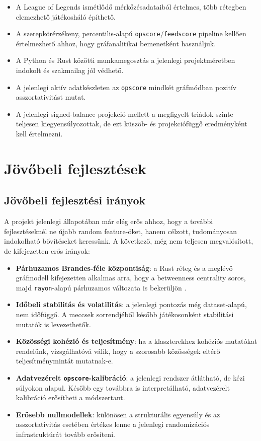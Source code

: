 \documentclass[a4paper,12pt]{report}
\begin{document}
\begin{itemize}
    \item A League of Legends ismétlődő mérkőzésadataiból értelmes, több rétegben elemezhető játékosháló építhető.
    \item A szerepkörérzékeny, percentilis-alapú \texttt{opscore}/\texttt{feedscore} pipeline kellően értelmezhető ahhoz, hogy gráfanalitikai bemenetként használjuk.
    \item A Python és Rust közötti munkamegosztás a jelenlegi projektméretben indokolt és szakmailag jól védhető.
    \item A jelenlegi aktív adatkészleten az \texttt{opscore} mindkét gráfmódban pozitív asszortativitást mutat.
    \item A jelenlegi signed-balance projekció mellett a megfigyelt triádok szinte teljesen kiegyensúlyozottak, de ezt küszöb- és projekciófüggő eredményként kell értelmezni.
\end{itemize}

\chapter{Jövőbeli fejlesztések}

\section{Jövőbeli fejlesztési irányok}

A projekt jelenlegi állapotában már elég erős ahhoz, hogy a további fejlesztéseknél ne újabb random feature-öket, hanem célzott, tudományosan indokolható bővítéseket keressünk. A következő, még nem teljesen megvalósított, de kifejezetten erős irányok:

\begin{itemize}
    \item \textbf{Párhuzamos Brandes-féle központiság}: a Rust réteg és a meglévő gráfmodell kifejezetten alkalmas arra, hogy a betweenness centrality soros, majd \texttt{rayon}-alapú párhuzamos változata is bekerüljön \cite{brandes2001}.
    \item \textbf{Időbeli stabilitás és volatilitás}: a jelenlegi pontozás még dataset-alapú, nem időfüggő. A meccsek sorrendjéből később játékosonként stabilitási mutatók is levezethetők.
    \item \textbf{Közösségi kohézió és teljesítmény}: ha a klaszterekhez kohéziós mutatókat rendelünk, vizsgálhatóvá válik, hogy a szorosabb közösségek eltérő teljesítménymintát mutatnak-e.
    \item \textbf{Adatvezérelt \texttt{opscore}-kalibráció}: a jelenlegi rendszer átlátható, de kézi súlyokon alapul. Később egy továbbra is interpretálható, adatvezérelt kalibráció erősítheti a módszertant.
    \item \textbf{Erősebb nullmodellek}: különösen a strukturális egyensúly és az asszortativitás esetében értékes lenne a jelenlegi randomizációs infrastruktúrát tovább erősíteni.
\end{itemize}
\end{document}
